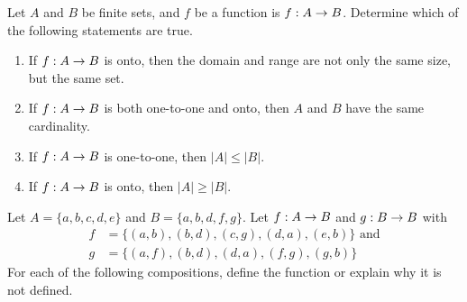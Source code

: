 \begin{questions}
 Let $A$ and $B$ be finite sets, and $f$ be a function is $f: A \rightarrow B$.  Determine which of the following statements are true. 
\begin{enumerate}[label=(\alph*),itemsep=0pt,parsep=0pt,topsep=0pt,partopsep=0pt]
    \item {}
    	If $f: A \rightarrow B$ is onto, then the domain and range are not only the same size, but the same set. 
    \item {}
    	If $f: A \rightarrow B$ is both one-to-one and onto, then $A$ and $B$ have the same cardinality. 
    \item {}
    	If $f: A \rightarrow B$ is one-to-one, then $|A| \leq |B|$.
    \item {} 
    	If $f: A \rightarrow B$ is onto, then $|A| \geq |B|$.
\end{enumerate}
    \ifprintanswers
        \vspace{-10pt}
    \fi
\begin{solution}
\end{solution}



 Let $A = \{a, b, c, d, e \}$ and $B = \{ a, b, d, f, g\}$.  Let $f : A \rightarrow B$ and $g : B \rightarrow B$ with 
\begin{align*}
    f &= \{(a, b), (b, d), (c, g), (d, a), (e, b) \} \text{  and} \\
    g &= \{ (a, f), (b, d), (d, a), (f, g), (g, b) \}
\end{align*}
For each of the following compositions, define the function or explain why it is not defined.


\end{questions}

